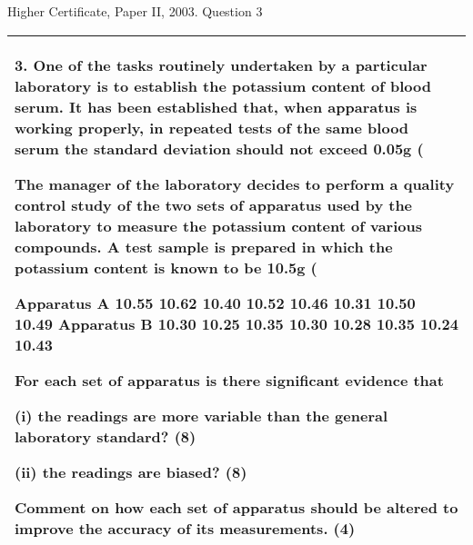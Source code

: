 \documentclass[a4paper,12pt]{article}
\begin{document}
Higher Certificate, Paper II, 2003. Question 3
 

\begin{table}[ht!]
 
\centering
 
\begin{tabular}{|p{15cm}|}
 
\hline 
3. One of the tasks routinely undertaken by a particular laboratory is to establish the potassium content of blood serum.  It has been established that, when apparatus is working properly, in repeated tests of the same blood serum the standard deviation should not exceed 0.05g (%
 
The manager of the laboratory decides to perform a quality control study of the two sets of apparatus used by the laboratory to measure the potassium content of various compounds.  A test sample is prepared in which the potassium content is known to be 10.5g (%
 
Apparatus A 10.55 10.62 10.40 10.52 10.46 10.31 10.50 10.49 Apparatus B 10.30 10.25 10.35 10.30 10.28 10.35 10.24 10.43 
 
For each set of apparatus is there significant evidence that 
 
(i) the readings are more variable than the general laboratory standard? 
(8) 
 
(ii) the readings are biased? 
(8) 
 
Comment on how each set of apparatus should be altered to improve the accuracy of its measurements. (4) 
\\ \hline
  
\end{tabular}

\end{table}

 
\end{document}
